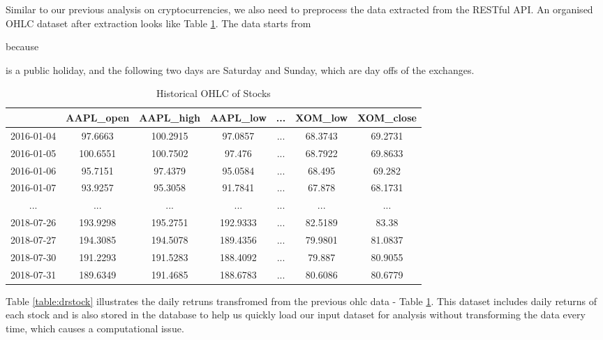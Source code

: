 \documentclass[11pt]{article} %
\theoremstyle{plain}
\theoremstyle{definition}
\begin{document}
Similar to our previous analysis on cryptocurrencies, we also need to preprocess the data extracted from the RESTful API. An organised OHLC dataset after extraction looks like Table \ref{table:ohlcstock}. The data starts from \date{4th January 2016} because \date{1st January 2016} is a public holiday, and the following two days are Saturday and Sunday, which are day offs of the exchanges.

{
  \begin{table}[ht]
    \centering
    \scriptsize
    \begin{tabular}{|c|c c c c c c|}
      \hline
       & AAPL\_open & AAPL\_high & AAPL\_low & ... & XOM\_low & XOM\_close \\ [0.5ex]
      \hline
      2016-01-04 & 97.6663 & 100.2915 & 97.0857 & ... & 68.3743 & 69.2731 \\
      \hline
      2016-01-05 & 100.6551 & 100.7502 & 97.476 & ... & 68.7922 & 69.8633 \\
      \hline
      2016-01-06 & 95.7151 & 97.4379 & 95.0584 & ... & 68.495 & 69.282 \\
      \hline
      2016-01-07 & 93.9257 & 95.3058 & 91.7841 & ... & 67.878 & 68.1731 \\
      \hline
      ... & ... & ... & ... & ... & ... & ... \\
      \hline
      2018-07-26 & 193.9298 & 195.2751 & 192.9333 & ... & 82.5189 & 83.38 \\
      \hline
      2018-07-27 & 194.3085 & 194.5078 & 189.4356 & ... & 79.9801 & 81.0837 \\
      \hline
      2018-07-30 & 191.2293 & 191.5283 & 188.4092 & ... & 79.887 & 80.9055 \\
      \hline
      2018-07-31 & 189.6349 & 191.4685 & 188.6783 & ... & 80.6086 & 80.6779 \\
      \hline
    \end{tabular}
    \caption{Historical OHLC of Stocks}
    \label{table:ohlcstock}
  \end{table}
}

Table \ref{table:drstock} illustrates the daily retruns transfromed from the previous ohlc data - Table \ref{table:ohlcstock}. This dataset includes daily returns of each stock and is also stored in the database to help us quickly load our input dataset for analysis without transforming the data every time, which causes a computational issue.
\end{document}
